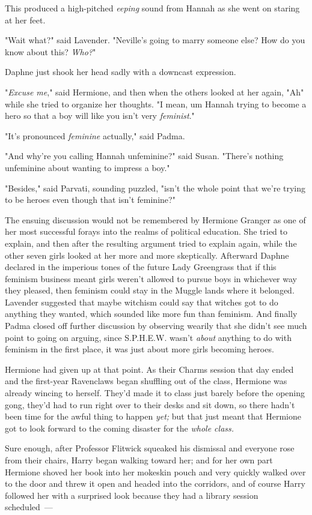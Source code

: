 This produced a high-pitched \emph{eeping} sound from Hannah as she went on
staring at her feet.

"Wait what?" said Lavender. "Neville's going to marry someone else? How do you
know about this? \emph{Who?}"

Daphne just shook her head sadly with a downcast expression.

"\emph{Excuse me}," said Hermione, and then when the others looked at her
again, "Ah{\el}" while she tried to organize her thoughts. "I mean,
um{\el} Hannah{\el} trying to become a hero so that a boy will like you
isn't very \emph{feminist}."

"It's pronounced \emph{feminine} actually," said Padma.

"And why're you calling Hannah unfeminine?" said Susan. "There's nothing
unfeminine about wanting to impress a boy."

"Besides," said Parvati, sounding puzzled, "isn't the whole point that we're
trying to be heroes even though that isn't feminine?"

The ensuing discussion would not be remembered by Hermione Granger as one of
her most successful forays into the realms of political education. She tried to
explain, and then after the resulting argument tried to explain again, while
the other seven girls looked at her more and more skeptically. Afterward Daphne
declared in the imperious tones of the future Lady Greengrass that if this
feminism business meant girls weren't allowed to pursue boys in whichever way
they pleased, then feminism could stay in the Muggle lands where it belonged.
Lavender suggested that maybe witchism could say that witches got to do
anything they wanted, which sounded like more fun than feminism. And finally
Padma closed off further discussion by observing wearily that she didn't see
much point to going on arguing, since S.P.H.E.W. wasn't \emph{about} anything
to do with feminism in the first place, it was just about more girls becoming
heroes.

Hermione had given up at that point.
\sbreak
As their Charms session that day ended and the first-year Ravenclaws began
shuffling out of the class, Hermione was already wincing to herself. They'd
made it to class just barely before the opening gong, they'd had to run right
over to their desks and sit down, so there hadn't been time for the awful thing
to happen \emph{yet;} but that just meant that Hermione got to look forward to
the coming disaster for the \emph{whole class.}

Sure enough, after Professor Flitwick squeaked his dismissal and everyone rose
from their chairs, Harry began walking toward her; and for her own part
Hermione shoved her book into her mokeskin pouch and very quickly walked over
to the door and threw it open and headed into the corridors, and of course
Harry followed her with a surprised look because they had a library session
scheduled~---

